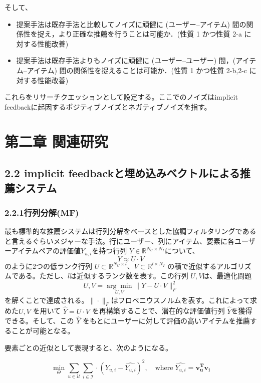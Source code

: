 \documentclass[11pt,a4paper]{article}
\begin{document}
そして、

\begin{itemize}
  \item 提案手法は既存手法と比較してノイズに頑健に (ユーザー–アイテム) 間の関係性を捉え，より正確な推薦を行うことは可能か．(性質 1 かつ性質 2-a に対する性能改善)
  \item 提案手法は既存手法よりもノイズに頑健に (ユーザー–ユーザー) 間，(アイテム–アイテム) 間の関係性を捉えることは可能か．(性質 1 かつ性質 2-b,2-c に対する性能改善)
\end{itemize}

これらをリサーチクエッションとして設定する。ここでのノイズはimplicit feedbackに起因するポジティブノイズとネガティブノイズを指す。

\section*{第二章 関連研究}

\subsection*{2.2 implicit feedbackと埋め込みベクトルによる推薦システム}

\subsubsection*{2.2.1行列分解(MF)}

最も標準的な推薦システムは行列分解をベースとした協調フィルタリングであると言えるぐらいメジャーな手法。行にユーザー、列にアイテム、要素に各ユーザーアイテムペアの評価値$Y_{u,i}$を持つ行列 $Y \in \mathbb{R}^{N_U \times N_I}$について、
$$
	Y \approx U \cdot V
$$
のように2つの低ランク行列 $U \subset \mathbb{R}^{N_U \times l}$、$V \subset \mathbb{R}^{l \times N_I}$ の積で近似するアルゴリズムである。ただし、$l$は近似するランク数を表す。この行列 $U,V$は、最適化問題
$$
	U, V = \underset{U, V}{\arg \min} \| Y - U \cdot V \|^2_F
$$
を解くことで達成される。$\| \cdot \|_F$はフロベニウスノルムを表す。これによって求めた$U, V$ を用いて $\hat{Y} = U \cdot V$ を再構築することで、潜在的な評価値行列 $\hat{Y}$を獲得できる。そして、この $\hat{Y}$ をもとにユーザーに対して評価の高いアイテムを推薦することが可能となる。

要素ごとの近似として表現すると、次のようになる。

$$
  \underset{\Theta}{\min} \sum_{u \in \mathcal{U}} \sum_{i \in \mathcal{I}} \cdot (Y_{u,i} - \hat{Y_{u,i}})^2, \quad \text{where} \; \hat{Y_{u,i}} = \mathbf{v_u^T} \mathbf{v_i}
$$
\end{document}
